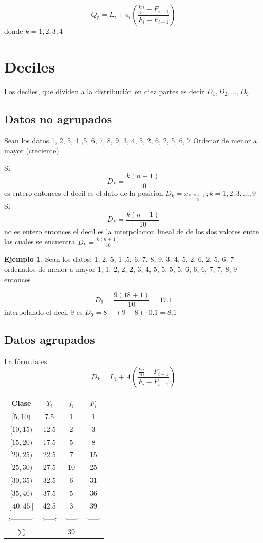 \documentclass[
  11pt,
]{krantz}
\theoremstyle{definition}
\theoremstyle{definition}
\newtheorem{example}{Ejemplo}[chapter]
\theoremstyle{definition}
\theoremstyle{definition}
\theoremstyle{remark}
\begin{document}
\[Q_5=L_i+ a_i\left(\frac{\frac{kn}{5}-F_{i-1}}{F_i-F_{i-1}}\right)\]
donde \(k=1,2,3,4\)

\hypertarget{deciles}{%
\section{Deciles}\label{deciles}}

Los deciles, que dividen a la distribución en diez partes es decir \(D_1, D_2,\ldots, D_9\)

\hypertarget{datos-no-agrupados-1}{%
\subsection{Datos no agrupados}\label{datos-no-agrupados-1}}

Sean los datos 1, 2, 5, 1 ,5, 6, 7, 8, 9, 3, 4, 5, 2, 6, 2, 5, 6, 7 Ordenar de menor a mayor (creciente)

Si \[D_k=\frac{k(n+1)}{10}\] es entero entonces el decil es el dato de la posicion \(D_k=x_\frac{k(n+1)}{10}; k=1, 2, 3, \ldots, 9\) Si \[D_k=\frac{k(n+1)}{10}\] no es entero entonces el decil es la interpolacion lineal de de los dos valores entre las cuales se encuentra \(D_k=\frac{k(n+1)}{10}\)

\begin{example}
Sean los datos: 1, 2, 5, 1 ,5, 6, 7, 8, 9, 3, 4, 5, 2, 6, 2, 5, 6, 7 ordenados de menor a mayor 1, 1, 2, 2, 2, 3, 4, 5, 5, 5, 5, 6, 6, 6, 7, 7, 8, 9 entonces

\[D_9=\frac{9(18+1)}{10}=17.1\] interpolando el decil 9 es \(D_9=8+(9-8)\cdot 0.1=8.1\)
\end{example}

\hypertarget{datos-agrupados-1}{%
\subsection{Datos agrupados}\label{datos-agrupados-1}}

La fórmula es
\[D_k=L_i+ A\left(\frac{\frac{kn}{10}-F_{i-1}}{F_i-F_{i-1}}\right)\]

\begin{longtable}[]{@{}cccc@{}}
\toprule
Clase & \(Y_i\) & \(f_i\) & \(F_i\) \\
\midrule
\endhead
\([5,10)\) & 7.5 & 1 & 1 \\
\([10,15)\) & 12.5 & 2 & 3 \\
\([15,20)\) & 17.5 & 5 & 8 \\
\([20,25)\) & 22.5 & 7 & 15 \\
\([25,30)\) & 27.5 & 10 & 25 \\
\([30,35)\) & 32.5 & 6 & 31 \\
\([35,40)\) & 37.5 & 5 & 36 \\
\([40,45]\) & 42.5 & 3 & 39 \\
:---------: & :-----: & :-----: & :-----: \\
\(\sum\) & & 39 & \\
\bottomrule
\end{longtable}
\end{document}
